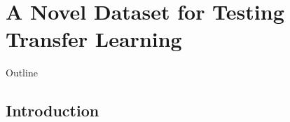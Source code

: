 \chapter{A Novel Dataset for Testing Transfer Learning}
\label{ch:minerva_paper}


\begin{remark}{Outline}
\end{remark}

\section{Introduction}


